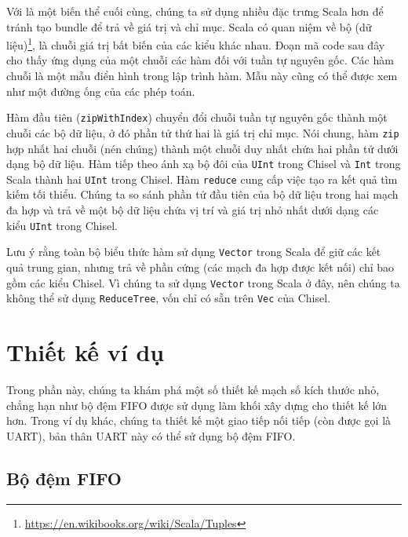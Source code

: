 \documentclass[%
    10pt,
    headinclude, footexclude,
    openright, %
    notitlepage,
    cleardoubleempty,
    headsepline,
    pointlessnumbers,
    bibtotoc, idxtotoc,
    ]{scrbook}
\newcommand{\code}[1]{{\small{\texttt{#1}}}}
\newcommand{\myref}[2]{\href{#1}{#2}}
\renewcommand{\myref}[2]{{#2}{\footnote{\url{#1}}}}
\begin{document}

Với là một biến thể cuối cùng, chúng ta sử dụng nhiều đặc trưng Scala hơn để tránh tạo bundle để trả về giá trị và chỉ mục. Scala có quan niệm về \myref{https://en.wikibooks.org/wiki/Scala/Tuples}{bộ (dữ liệu)}, là chuỗi giá trị bất biến của các kiểu khác nhau. Đoạn mã code sau đây cho thấy ứng dụng của một chuỗi các hàm đối với tuần tự nguyên gốc. Các hàm chuỗi là một mẫu điển hình trong lập trình hàm. Mẫu này cũng có thể được xem như một đường ống của các phép toán.

Hàm đầu tiên (\code{zipWithIndex}) chuyển đổi chuỗi tuần tự nguyên gốc thành một chuỗi các bộ dữ liệu, ở đó phần tử thứ hai là giá trị chỉ mục. Nói chung, hàm \code{zip} hợp nhất hai chuỗi (nén chúng) thành một chuỗi duy nhất chứa hai phần tử dưới dạng bộ dữ liệu. Hàm tiếp theo ánh xạ bộ đôi của \code{UInt} trong Chisel và \code{Int} trong Scala thành hai \code{UInt} trong Chisel. Hàm \code{reduce} cung cấp việc tạo ra kết quả tìm kiếm tối thiểu. Chúng ta so sánh phần tử đầu tiên của bộ dữ liệu trong hai mạch đa hợp và trả về một bộ dữ liệu chứa vị trí và giá trị nhỏ nhất dưới dạng các kiểu \code{UInt} trong Chisel. 


Lưu ý rằng toàn bộ biểu thức hàm sử dụng \code{Vector} trong Scala để giữ các kết quả trung gian, nhưng trả về phần cứng (các mạch đa hợp được kết nối) chỉ bao gồm các kiểu Chisel. Vì chúng ta sử dụng \code{Vector} trong Scala ở đây, nên chúng ta không thể sử dụng \code{ReduceTree}, vốn chỉ có sẵn trên \code{Vec} của Chisel. 


\chapter{Thiết kế ví dụ}

Trong phần này, chúng ta khám phá một số thiết kế mạch số kích thước nhỏ, chẳng hạn như bộ đệm FIFO được sử dụng làm khối xây dựng cho thiết kế lớn hơn. Trong ví dụ khác, chúng ta thiết kế một giao tiếp nối tiếp (còn được gọi là UART), bản thân UART này có thể sử dụng bộ đệm FIFO. 

\section{Bộ đệm FIFO}
\label{sec:fifo}

\end{document}
